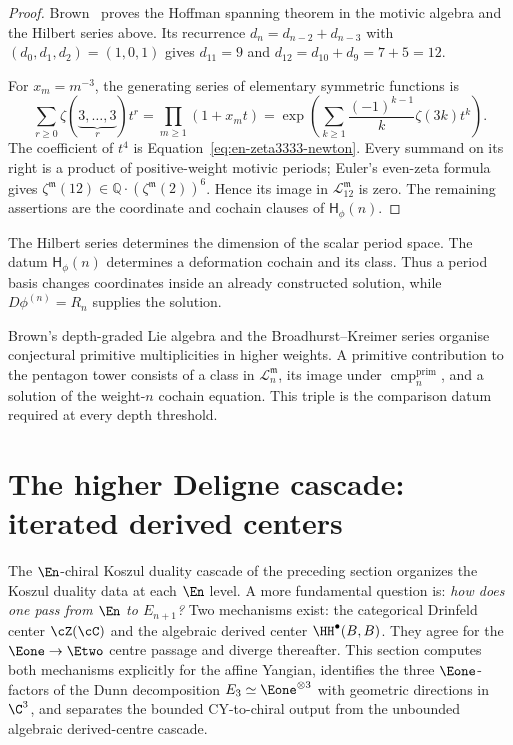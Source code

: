 \begin{proof}
Brown~\cite{Brown2012} proves the Hoffman spanning theorem in the
motivic algebra and the Hilbert series above.  Its recurrence
$d_n=d_{n-2}+d_{n-3}$ with $(d_0,d_1,d_2)=(1,0,1)$ gives
$d_{11}=9$ and $d_{12}=d_{10}+d_9=7+5=12$.

For $x_m=m^{-3}$, the generating series of elementary symmetric
functions is
\[
 \sum_{r\geq0}\zeta(\underbrace{3,\ldots,3}_{r})t^r
 =\prod_{m\geq1}(1+x_mt)
 =\exp\!\left(\sum_{k\geq1}
   \frac{(-1)^{k-1}}{k}\zeta(3k)t^k\right).
\]
The coefficient of $t^4$ is
Equation~\eqref{eq:en-zeta3333-newton}.  Every summand on its right is
a product of positive-weight motivic periods; Euler's even-zeta formula
gives $\zeta^{\mathfrak m}(12)\in
\mathbb Q\cdot(\zeta^{\mathfrak m}(2))^6$.  Hence its image in
$\mathcal L^{\mathfrak m}_{12}$ is zero.  The remaining assertions are
the coordinate and cochain clauses of $\mathsf H_{\phi}(n)$.
\end{proof}

\begin{remark}
\label{rem:phi-n-sharpening}
The Hilbert series determines the dimension of the scalar period space.
The datum $\mathsf H_{\phi}(n)$ determines a deformation cochain and
its class.  Thus a period basis changes coordinates inside an already
constructed solution, while $D\phi^{(n)}=R_n$ supplies the solution.
\end{remark}

\begin{remark}
\label{rem:weight-25-threshold}
Brown's depth-graded Lie algebra and the Broadhurst--Kreimer series
organise conjectural primitive multiplicities in higher weights.  A
primitive contribution to the pentagon tower consists of a class in
$\mathcal L^{\mathfrak m}_n$, its image under
$\operatorname{cmp}^{\mathrm{prim}}_n$, and a solution of the
weight-$n$ cochain equation.  This triple is the comparison datum
required at every depth threshold.
\end{remark}

\section{The higher Deligne cascade: iterated derived centers}
\label{sec:higher-deligne-cascade}

The $\En$-chiral Koszul duality cascade of the preceding section organizes the Koszul duality data at each $\En$ level. A more fundamental question is: \emph{how does one pass from $\En$ to $E_{n+1}$?} Two mechanisms exist: the categorical Drinfeld center $\cZ(\cC)$ and the algebraic derived center $\HH^\bullet(B, B)$. They agree for the \(\Eone \to \Etwo\) centre passage and diverge thereafter. This section computes both mechanisms explicitly for the affine Yangian, identifies the three $\Eone$-factors of the Dunn decomposition $E_3 \simeq \Eone^{\otimes 3}$ with geometric directions in $\C^3$, and separates the bounded CY-to-chiral output from the unbounded algebraic derived-centre cascade.

